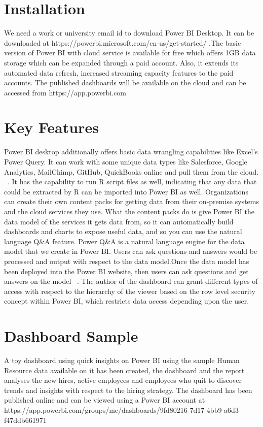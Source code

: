 \section{Installation}
We need a work or university email id to download Power BI Desktop. It can be 
downloaded at https://powerbi.microsoft.com/en-us/get-started/ .The basic 
version of Power BI with cloud service is available for free which offers 
1GB data storage which can be expanded through a paid account. Also, it extends
its automated data refresh, increased streaming capacity features to the paid 
accounts. The published dashboards will be available on the cloud and can be 
accessed from https://app.powerbi.com
 
\section{Key Features}
Power BI desktop additionally offers basic data wrangling capabilities like 
Excel's Power Query. It can work with some unique data types like Salesforce, 
Google Analytics, MailChimp, GitHub, QuickBooks online and pull them from the 
cloud. ~\cite{hid-sp18-418-power bi-intro}.
It has the capability to run R script files as well, indicating that any data 
that could be extracted by R can be imported into Power BI as well. 
Organizations can create their own content packs for getting data from their 
on-premise systems and the cloud services they use. What the content packs do 
is give Power BI the data model of the services it gets data from, so it can 
automatically build dashboards and charts to expose useful data, and so you 
can use the natural language Q&A feature. Power Q&A is a natural language 
engine for the data model that we create in Power BI. Users can ask questions 
and answers would be processed and output with respect to the data model.Once 
the data model has been deployed into the Power BI website, then users can ask 
questions and get answers on the model ~\cite{hid-sp18-418-power bi-intro}.
The author of the dashboard can grant different types of access with respect 
to the hierarchy of the viewer based on the row level security concept within 
Power BI, which restricts data access depending upon the user.

 
\section{Dashboard Sample}
A toy dashboard using quick insights on Power BI using the sample Human 
Resource data available on it has been created, the dashboard and the report 
analyses the new hires, active employees and employees who quit to discover 
trends and insights with respect to the hiring strategy. The dashboard has 
been published online and can be viewed using a Power BI account at \\ 
https://app.powerbi.com/groups/me/dashboards/9fd80216-7d17-4bb9-a6d3-f47ddb661971
\\

